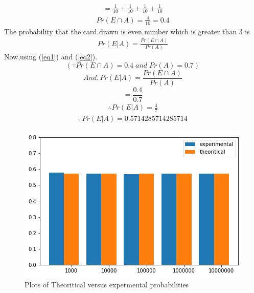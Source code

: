 \documentclass[journal,12pt,twocolumn]{IEEEtran}
\begin{document}
\begin{align}
   =\frac{1}{10}+\frac{1}{10}+\frac{1}{10}+\frac{1}{10}
\end{align}
\begin{align}
\label{eq2}
     Pr(E \cap A) =\frac{4}{10}=0.4
\end{align}
The probability that the card drawn is even number which is greater than 3 is
\begin{align}
    Pr(E|A)=\frac{Pr(E\cap A)}{Pr(A)}
\end{align}
Now,using (\ref{eq1}) and (\ref{eq2}). 
$$(\because Pr(E \cap A)=0.4\; and \; Pr(A)=0.7)$$
$$And, Pr(E|A)=\frac{Pr(E\cap A)}{Pr(A)}$$
$$=\frac{0.4}{0.7}$$
\begin{align}
\therefore Pr(E|A)=\frac{4}{7}    
\end{align}
\begin{align}
\therefore Pr(E|A)=0.5714285714285714    
\end{align}
\begin{figure}
   \caption{Plots of Theoritical versus expermental probabilities}
    \centering
    \includegraphics[width=\columnwidth]
    {Figure.png}
\end{figure}
\end{document}
